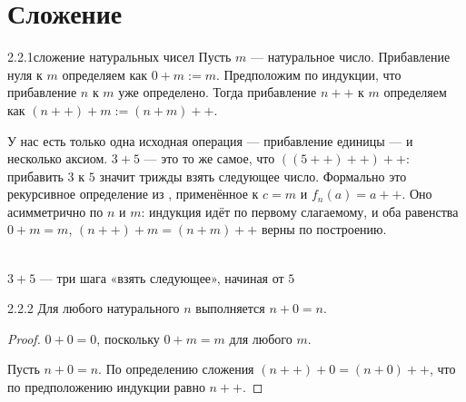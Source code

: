\section{Сложение}

\begin{definition}{2.2.1}{сложение натуральных чисел}
Пусть $m$ — натуральное число. Прибавление нуля к $m$ определяем как $0+m := m$.
Предположим по индукции, что прибавление $n$ к $m$ уже определено. Тогда прибавление
$n{+}{+}$ к $m$ определяем как $(n{+}{+})+m := (n+m){+}{+}$.
\end{definition}

\begin{remark}
У нас есть только одна исходная операция — прибавление единицы — и несколько аксиом.
$3+5$ — это то же самое, что $((5{+}{+}){+}{+}){+}{+}$: прибавить $3$ к $5$ значит трижды
взять следующее число. Формально это рекурсивное определение из
, применённое к $c=m$ и $f_n(a) = a{+}{+}$. Оно
асимметрично по $n$ и $m$: индукция идёт по первому слагаемому, и оба равенства
$0+m=m$, $(n{+}{+})+m=(n+m){+}{+}$ верны по построению.

\begin{center}
\\
{\footnotesize\color{intuitiongray}$3+5$ — три шага «взять следующее», начиная от $5$}
\end{center}
\end{remark}

\begin{lemma}{2.2.2}{}
Для любого натурального $n$ выполняется $n+0=n$.
\end{lemma}

\begin{proof}
 $0+0=0$, поскольку $0+m=m$ для любого $m$.

 Пусть $n+0=n$. По определению сложения $(n{+}{+})+0=(n+0){+}{+}$,
что по предположению индукции равно $n{+}{+}$.
\end{proof}


